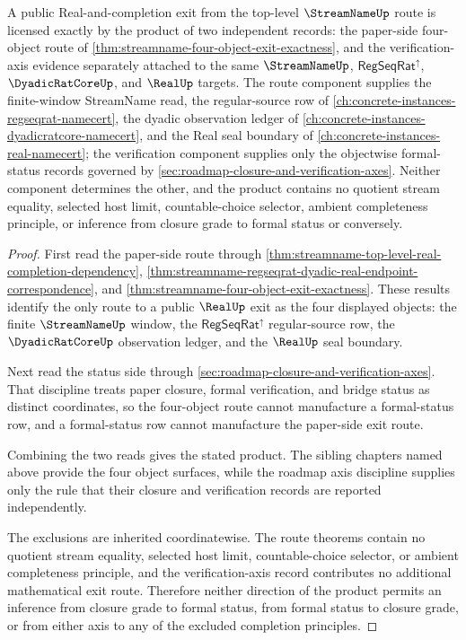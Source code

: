 \begin{theorem}
\label{thm:streamname-four-object-exit-status-product}
A public Real-and-completion exit from the top-level $\StreamNameUp$ route is licensed exactly by the product of two independent records: the paper-side four-object route of \autoref{thm:streamname-four-object-exit-exactness}, and the verification-axis evidence separately attached to the same $\StreamNameUp$, $\mathsf{RegSeqRat}^{\uparrow}$, $\DyadicRatCoreUp$, and $\RealUp$ targets. The route component supplies the finite-window StreamName read, the regular-source row of \autoref{ch:concrete-instances-regseqrat-namecert}, the dyadic observation ledger of \autoref{ch:concrete-instances-dyadicratcore-namecert}, and the Real seal boundary of \autoref{ch:concrete-instances-real-namecert}; the verification component supplies only the objectwise formal-status records governed by \autoref{sec:roadmap-closure-and-verification-axes}. Neither component determines the other, and the product contains no quotient stream equality, selected host limit, countable-choice selector, ambient completeness principle, or inference from closure grade to formal status or conversely.
\end{theorem}
\begin{proof}
First read the paper-side route through \autoref{thm:streamname-top-level-real-completion-dependency}, \autoref{thm:streamname-regseqrat-dyadic-real-endpoint-correspondence}, and \autoref{thm:streamname-four-object-exit-exactness}. These results identify the only route to a public $\RealUp$ exit as the four displayed objects: the finite $\StreamNameUp$ window, the $\mathsf{RegSeqRat}^{\uparrow}$ regular-source row, the $\DyadicRatCoreUp$ observation ledger, and the $\RealUp$ seal boundary.

Next read the status side through \autoref{sec:roadmap-closure-and-verification-axes}. That discipline treats paper closure, formal verification, and bridge status as distinct coordinates, so the four-object route cannot manufacture a formal-status row, and a formal-status row cannot manufacture the paper-side exit route.

Combining the two reads gives the stated product. The sibling chapters named above provide the four object surfaces, while the roadmap axis discipline supplies only the rule that their closure and verification records are reported independently.

The exclusions are inherited coordinatewise. The route theorems contain no quotient stream equality, selected host limit, countable-choice selector, or ambient completeness principle, and the verification-axis record contributes no additional mathematical exit route. Therefore neither direction of the product permits an inference from closure grade to formal status, from formal status to closure grade, or from either axis to any of the excluded completion principles.
\end{proof}

